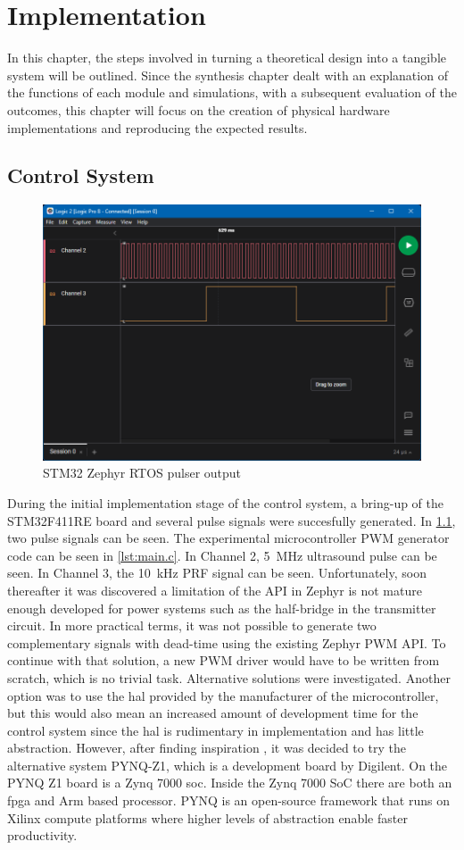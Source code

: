 \chapter{Implementation}
In this chapter, the steps involved in turning a theoretical design into a tangible system will be outlined. Since the synthesis chapter dealt with an explanation of the functions of each module and simulations, with a subsequent evaluation of the outcomes, this chapter will focus on the creation of physical hardware implementations and reproducing the expected results.
\section{Control System}
\begin{figure}[htbp]
	\centering
	\includegraphics[width=.8\textwidth]{Figures/4_controlsystem_stm32_zephyr.png}
	\caption{STM32 Zephyr RTOS pulser output}
	\label{fig:4_stm32_zephyr_pulser}
\end{figure}
During the initial implementation stage of the control system, a bring-up of the STM32F411RE board and several pulse signals were succesfully generated. In \cref{fig:4_stm32_zephyr_pulser}, two pulse signals can be seen. The experimental microcontroller PWM generator code can be seen in \cref{lst:main.c}. In Channel 2, \qty{5}{\mega\hertz} ultrasound pulse can be seen. In Channel 3, the \qty{10}{\kilo\hertz} PRF signal can be seen. Unfortunately, soon thereafter it was discovered a limitation of the API in Zephyr is not mature enough developed for power systems such as the half-bridge in the transmitter circuit. In more practical terms, it was not possible to generate two complementary signals with dead-time using the existing Zephyr PWM API. To continue with that solution, a new PWM driver would have to be written from scratch, which is no trivial task. Alternative solutions were investigated. Another option was to use the \gls{hal} provided by the manufacturer of the microcontroller, but this would also mean an increased amount of development time for the control system since the \gls{hal} is rudimentary in implementation and has little abstraction. However, after finding inspiration \cite{vhdl_pwm_gen}, it was decided to try the alternative system PYNQ-Z1, which is a development board by Digilent. On the PYNQ Z1 board is a Zynq 7000 \gls{soc}. Inside the Zynq 7000 SoC there are both an \gls{fpga} and Arm based processor. PYNQ is an open-source framework that runs on Xilinx compute platforms where higher levels of abstraction enable faster productivity.

